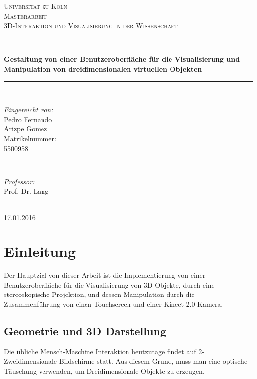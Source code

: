 \documentclass[12pt]{extarticle}
\date{}
\begin{document}
\begin{titlepage}
\newcommand{\HRule}{\rule{\linewidth}{0.5mm}}
\center
\textsc{\LARGE Universität zu Köln}\\[1.5cm]
\textsc{\Large Masterarbeit}\\[0.5cm] 
\textsc{\large 3D-Interaktion und Visualisierung in der Wissenschaft}\\[0.5cm] 
\HRule \\[0.4cm]
{ \Large \bfseries Gestaltung von einer Benutzeroberfläche für die Visualisierung und Manipulation von dreidimensionalen virtuellen Objekten}\\[0.4cm]
\HRule \\[1.5cm]
\begin{minipage}{0.4\textwidth}
\begin{flushleft} \large
\emph{Eingereicht von:}\\
Pedro Fernando \\
Arizpe Gomez\\ 
		Matrikelnummer:\\5500958 
\end{flushleft}
\end{minipage}
~
\begin{minipage}{0.4\textwidth}
\begin{flushright}
\large\emph{Professor:} \\
Prof. Dr. Lang
\end{flushright}
\end{minipage}\\[4cm]
{\large 17.01.2016}\\[3cm] 
\vfill 
\end{titlepage}
\tableofcontents
\pagebreak{}

\section{Einleitung} Der Hauptziel von dieser Arbeit ist die Implementierung von einer Benutzeroberfläche für die Visualisierung von 3D Objekte, durch eine stereoskopische Projektion, und dessen Manipulation durch die Zusammenführung von einen Touchscreen und einer Kinect 2.0 Kamera.
\subsection{Geometrie und 3D Darstellung}
Die übliche Mensch-Maschine Interaktion heutzutage findet auf 2-Zweidimensionale Bildschirme statt. Aus diesem Grund, muss man eine optische Täuschung verwenden, um Dreidimensionale Objekte zu erzeugen.\\
\end{document}
